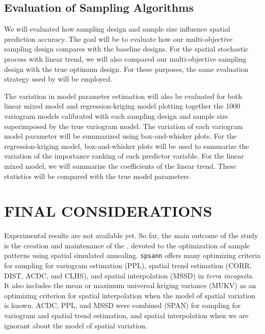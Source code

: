 \subsection{Evaluation of Sampling Algorithms}

We will evaluated how sampling design and sample size influence spatial prediction accuracy. The goal will be 
to evaluate how our multi-objective sampling design compares with the baseline designs. For the spatial 
stochastic process with linear trend, we will also compared our multi-objective sampling design with the true 
optimum design. For these purposes, the same evaluation strategy used by \cite{Samuel-RosaEtAl2016} will be 
employed.

The variation in model parameter estimation will also be evaluated for both linear mixed model and 
regression-kriging model plotting together the 1000 variogram models calibrated with each sampling design and 
sample size superimposed by the true variogram model. The variation of each variogram model parameter will be 
summarized using box-and-whisker plots. For the regression-kriging model, box-and-whisker plots will be used 
to summarize the variation of the importance ranking of each predictor variable. For the linear mixed model, 
we will summarize the coefficients of the linear trend. These statistics will be compared with the true model 
parameters.

\section{FINAL CONSIDERATIONS}

Experimental results are not available yet. So far, the main outcome of the study is the creation and 
maintenance of the , devoted to the optimization of sample patterns using spatial simulated 
annealing. \texttt{spsann} offers many optimizing criteria for sampling for variogram estimation (PPL), 
spatial trend estimation (CORR, DIST, ACDC, and CLHS), and spatial interpolation (MSSD) in \emph{terra 
incognita}. It also  includes the mean or maximum universal kriging variance (MUKV) as an optimizing criterion 
for spatial interpolation when the model of spatial variation is known. ACDC, PPL, and MSSD were combined 
(SPAN) for sampling for variogram and spatial trend estimation, and spatial interpolation when we are ignorant 
about the model of spatial variation.
